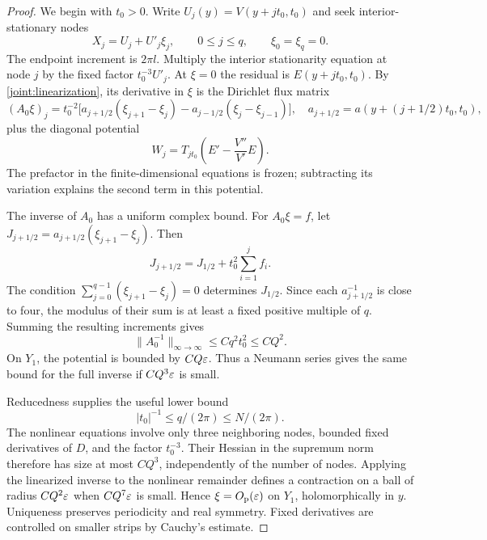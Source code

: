 \begin{proof}
We begin with \(t_0>0\).  Write \(U_j(y)=V(y+jt_0,t_0)\) and seek
interior-stationary nodes
\[
 X_j=U_j+U'_j\xi_j,\qquad 0\le j\le q,
 \qquad \xi_0=\xi_q=0.
\]
The endpoint increment is \(2\pi l\).  Multiply the interior
stationarity equation at node \(j\) by the fixed factor
\(t_0^{-3}U'_j\).  At \(\xi=0\) the residual is
\(E(y+jt_0,t_0)\).  By \eqref{joint:linearization}, its derivative in
\(\xi\) is the Dirichlet flux matrix
\begin{equation}
 (A_0\xi)_j=t_0^{-2}
 \bigl[a_{j+1/2}(\xi_{j+1}-\xi_j)
       -a_{j-1/2}(\xi_j-\xi_{j-1})\bigr],
 \quad a_{j+1/2}=a(y+(j+1/2)t_0,t_0),
 \label{joint:dirichlet}
\end{equation}
plus the diagonal potential
\[
 W_j=T_{jt_0}\left(E'-\frac{V''}{V'}E\right).
\]
The prefactor in the finite-dimensional equations is frozen; subtracting
its variation explains the second term in this potential.

The inverse of \(A_0\) has a uniform complex bound.  For
\(A_0\xi=f\), let
\(J_{j+1/2}=a_{j+1/2}(\xi_{j+1}-\xi_j)\).  Then
\[
 J_{j+1/2}=J_{1/2}+t_0^2\sum_{i=1}^j f_i.
\]
The condition \(\sum_{j=0}^{q-1}(\xi_{j+1}-\xi_j)=0\) determines
\(J_{1/2}\).  Since each \(a_{j+1/2}^{-1}\) is close to four, the
modulus of their sum is at least a fixed positive multiple of \(q\).
Summing the resulting increments gives
\begin{equation}
 \|A_0^{-1}\|_{\infty\to\infty}\le Cq^2t_0^2\le CQ^2.
 \label{joint:dirichlet-inverse}
\end{equation}
On \(Y_1\), the potential is bounded by \(CQ\varepsilon\).  Thus a Neumann
series gives the same bound for the full inverse if \(CQ^3\varepsilon\) is
small.

Reducedness supplies the useful lower bound
\begin{equation}
 |t_0|^{-1}\le q/(2\pi)\le N/(2\pi).
 \label{joint:rational-bound}
\end{equation}
The nonlinear equations involve only three neighboring nodes, bounded
fixed derivatives of \(D\), and the factor \(t_0^{-3}\).  Their Hessian
in the supremum norm therefore has size at most \(CQ^3\), independently
of the number of nodes.  Applying the linearized inverse to the
nonlinear remainder defines a contraction on a ball of radius
\(CQ^2\varepsilon\) when \(CQ^7\varepsilon\) is small.  Hence
\(\xi=O_{\mathrm p}(\varepsilon)\) on \(Y_1\), holomorphically in \(y\).
Uniqueness preserves periodicity and real symmetry.  Fixed derivatives
are controlled on smaller strips by Cauchy's estimate.


\end{proof}
